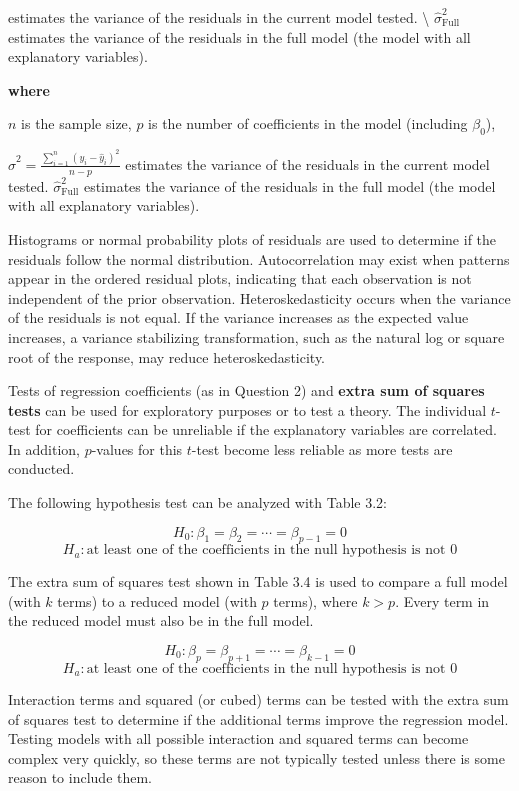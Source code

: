 \documentclass[
]{report}
\begin{document}
estimates the variance of the residuals in the current model tested. \textbackslash{}
\(\hat{\sigma}_{\text{Full}}^2\) estimates the variance of the residuals in the full model (the model with all explanatory variables).

\vspace{0.5em}

\textbf{where}

\quad \(n\) is the sample size,
\quad \(p\) is the number of coefficients in the model (including \(\beta_0\)),

\(\hat{\sigma}^2 = \frac{\sum_{i=1}^n (y_i - \hat{y}_i)^2}{n - p}\) estimates the variance of the residuals in the current model tested.
\(\hat{\sigma}_{\text{Full}}^2\) estimates the variance of the residuals in the full model (the model with all explanatory variables).

Histograms or normal probability plots of residuals are used to determine if the residuals follow the normal distribution. Autocorrelation may exist when patterns appear in the ordered residual plots, indicating that each observation is not independent of the prior observation. Heteroskedasticity occurs when the variance of the residuals is not equal. If the variance increases as the expected value increases, a variance stabilizing transformation, such as the natural log or square root of the response, may reduce heteroskedasticity.

Tests of regression coefficients (as in Question 2) and \textbf{extra sum of squares tests} can be used for exploratory purposes or to test a theory. The individual \(t\)-test for coefficients can be unreliable if the explanatory variables are correlated. In addition, \(p\)-values for this \(t\)-test become less reliable as more tests are conducted.

The following hypothesis test can be analyzed with Table 3.2:

\[
H_0\!: \beta_1 = \beta_2 = \cdots = \beta_{p-1} = 0
\]
\[
H_a\!: \text{at least one of the coefficients in the null hypothesis is not 0}
\]

The extra sum of squares test shown in Table 3.4 is used to compare a full model (with \(k\) terms) to a reduced model (with \(p\) terms), where \(k > p\). Every term in the reduced model must also be in the full model.

\[
H_0\!: \beta_p = \beta_{p+1} = \cdots = \beta_{k-1} = 0
\]
\[
H_a\!: \text{at least one of the coefficients in the null hypothesis is not 0}
\]

Interaction terms and squared (or cubed) terms can be tested with the extra sum of squares test to determine if the additional terms improve the regression model. Testing models with all possible interaction and squared terms can become complex very quickly, so these terms are not typically tested unless there is some reason to include them.
\end{document}
